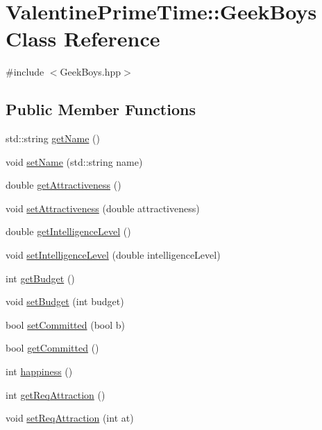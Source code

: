 \hypertarget{classValentinePrimeTime_1_1GeekBoys}{}\section{Valentine\+Prime\+Time\+:\+:Geek\+Boys Class Reference}
\label{classValentinePrimeTime_1_1GeekBoys}


{\ttfamily \#include $<$Geek\+Boys.\+hpp$>$}

\subsection*{Public Member Functions}
\begin{DoxyCompactItemize}
\item 
std\+::string \hyperlink{classValentinePrimeTime_1_1GeekBoys_a76f0a4ca28c7080b0f61aed0dc6ccaaf}{get\+Name} ()
\item 
void \hyperlink{classValentinePrimeTime_1_1GeekBoys_a269c0422f5897d9ee415534c4872a7dd}{set\+Name} (std\+::string name)
\item 
double \hyperlink{classValentinePrimeTime_1_1GeekBoys_aaef699271498a1f17f62ce0a9e3b095e}{get\+Attractiveness} ()
\item 
void \hyperlink{classValentinePrimeTime_1_1GeekBoys_ae2264065c398670653b725983389a27f}{set\+Attractiveness} (double attractiveness)
\item 
double \hyperlink{classValentinePrimeTime_1_1GeekBoys_a4a8a697c8866120e1c3605a8340e89e1}{get\+Intelligence\+Level} ()
\item 
void \hyperlink{classValentinePrimeTime_1_1GeekBoys_a39cc3df57069b06d60715a9f082976cd}{set\+Intelligence\+Level} (double intelligence\+Level)
\item 
int \hyperlink{classValentinePrimeTime_1_1GeekBoys_ad1574a8a5c76981bdb57f2abab9d2c35}{get\+Budget} ()
\item 
void \hyperlink{classValentinePrimeTime_1_1GeekBoys_ab601f93d180c36753dcf5398fc32e985}{set\+Budget} (int budget)
\item 
bool \hyperlink{classValentinePrimeTime_1_1GeekBoys_a052981302e69000e53f5c3d2df2389fc}{set\+Committed} (bool b)
\item 
bool \hyperlink{classValentinePrimeTime_1_1GeekBoys_a951ea4a43b0f8f6e1b364e75219078c7}{get\+Committed} ()
\item 
int \hyperlink{classValentinePrimeTime_1_1GeekBoys_abe862d56c9b17a1665a61bc5f88964c1}{happiness} ()
\item 
int \hyperlink{classValentinePrimeTime_1_1GeekBoys_acf94dccd9b17665e85729283e0967a00}{get\+Req\+Attraction} ()
\item 
void \hyperlink{classValentinePrimeTime_1_1GeekBoys_ad5e9658844f8704bb89cd3b41d8f5441}{set\+Req\+Attraction} (int at)
\end{DoxyCompactItemize}


